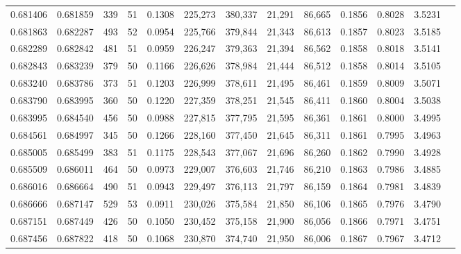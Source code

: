 \begin{tabular}{rrrrrrrrrrrrr}
0.681406 & 0.681859 &   339 &  51 &                                     0.1308 & 225,273 & 380,337 &  21,291 &  86,665 & 0.1856 & 0.8028 & 3.5231 \\
0.681863 & 0.682287 &   493 &  52 &                                     0.0954 & 225,766 & 379,844 &  21,343 &  86,613 & 0.1857 & 0.8023 & 3.5185 \\
0.682289 & 0.682842 &   481 &  51 &                                     0.0959 & 226,247 & 379,363 &  21,394 &  86,562 & 0.1858 & 0.8018 & 3.5141 \\
0.682843 & 0.683239 &   379 &  50 &                                     0.1166 & 226,626 & 378,984 &  21,444 &  86,512 & 0.1858 & 0.8014 & 3.5105 \\
0.683240 & 0.683786 &   373 &  51 &                                     0.1203 & 226,999 & 378,611 &  21,495 &  86,461 & 0.1859 & 0.8009 & 3.5071 \\
0.683790 & 0.683995 &   360 &  50 &                                     0.1220 & 227,359 & 378,251 &  21,545 &  86,411 & 0.1860 & 0.8004 & 3.5038 \\
0.683995 & 0.684540 &   456 &  50 &                                     0.0988 & 227,815 & 377,795 &  21,595 &  86,361 & 0.1861 & 0.8000 & 3.4995 \\
0.684561 & 0.684997 &   345 &  50 &                                     0.1266 & 228,160 & 377,450 &  21,645 &  86,311 & 0.1861 & 0.7995 & 3.4963 \\
0.685005 & 0.685499 &   383 &  51 &                                     0.1175 & 228,543 & 377,067 &  21,696 &  86,260 & 0.1862 & 0.7990 & 3.4928 \\
0.685509 & 0.686011 &   464 &  50 &                                     0.0973 & 229,007 & 376,603 &  21,746 &  86,210 & 0.1863 & 0.7986 & 3.4885 \\
0.686016 & 0.686664 &   490 &  51 &                                     0.0943 & 229,497 & 376,113 &  21,797 &  86,159 & 0.1864 & 0.7981 & 3.4839 \\
0.686666 & 0.687147 &   529 &  53 &                                     0.0911 & 230,026 & 375,584 &  21,850 &  86,106 & 0.1865 & 0.7976 & 3.4790 \\
0.687151 & 0.687449 &   426 &  50 &                                     0.1050 & 230,452 & 375,158 &  21,900 &  86,056 & 0.1866 & 0.7971 & 3.4751 \\
0.687456 & 0.687822 &   418 &  50 &                                     0.1068 & 230,870 & 374,740 &  21,950 &  86,006 & 0.1867 & 0.7967 & 3.4712 \\

\end{tabular}
